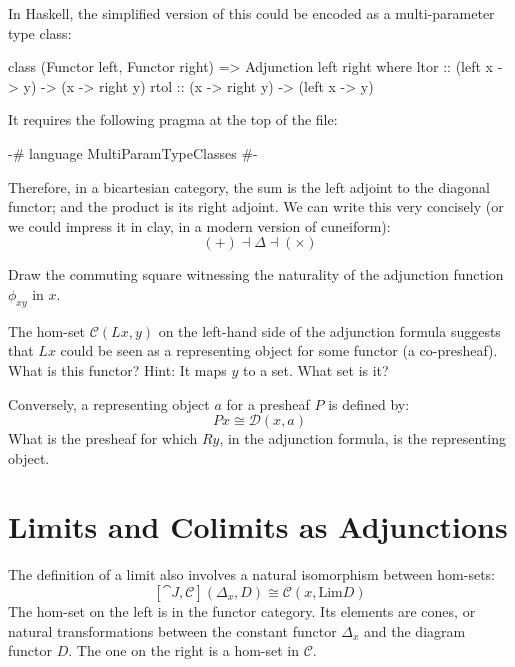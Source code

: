 \documentclass[DaoFP]{subfiles}
\begin{document}
In Haskell, the simplified version of this could be encoded as a multi-parameter type class:
\begin{haskell}
class (Functor left, Functor right) => Adjunction left right where
  ltor :: (left x -> y) -> (x -> right y)
  rtol :: (x -> right y) -> (left x -> y)
\end{haskell}
It requires the following pragma at the top of the file:
\begin{haskell}
{-# language MultiParamTypeClasses #-}
\end{haskell}



Therefore, in a bicartesian category, the sum is the left adjoint to the diagonal functor; and the product is its right adjoint. We can write this very concisely (or we could impress it in clay, in a modern version of cuneiform):
\[ (+) \dashv \Delta \dashv (\times) \]

\begin{exercise}
Draw the commuting square witnessing the naturality of the adjunction function $\phi_{x y}$ in $x$.
\end{exercise}

\begin{exercise}
The hom-set $\mathcal{C} (L x, y)$ on the left-hand side of the adjunction formula suggests that $L x$ could be seen as a representing object for some functor (a co-presheaf). What is this functor? Hint: It maps $y$ to a set. What set is it?
\end{exercise}

\begin{exercise}
Conversely, a representing object $a$ for a presheaf $P$ is defined by:
\[P x \cong \mathcal{D}(x, a)\]
What is the presheaf for which $R y$, in the adjunction formula, is the representing object.
\end{exercise}

\section{Limits and Colimits as Adjunctions}

The definition of a limit also involves a natural isomorphism between hom-sets:
\[ [\cat J, \mathcal{C}](\Delta_x, D)  \cong \mathcal{C}(x, \text{Lim} D) \]
The hom-set on the left is in the functor category. Its elements are cones, or natural transformations between the constant functor $\Delta_x$ and the diagram functor $D$. The one on the right is a hom-set in $\mathcal{C}$. 
\end{document}
